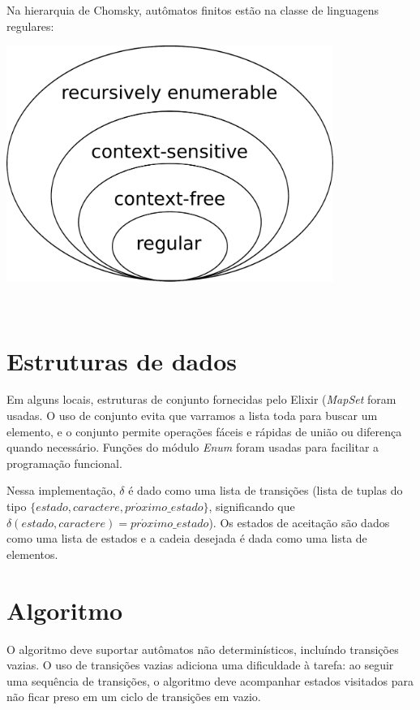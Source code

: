 \documentclass[conference]{IEEEtran}
\begin{document}
Na hierarquia de Chomsky, autômatos finitos estão na classe de linguagens regulares:

\begin{minipage}{\linewidth}
    \centering
    \label{chomsky}
    \includegraphics[width=0.8\textwidth]{Chomsky-hierarchy.pdf}
\end{minipage}
\\

\section{Estruturas de dados}

Em alguns locais, estruturas de conjunto fornecidas pelo Elixir (\emph{MapSet} foram usadas. O uso de conjunto evita que varramos a lista toda para buscar um elemento, e o conjunto permite operações fáceis e rápidas de união ou diferença quando necessário. Funções do módulo \emph{Enum} foram usadas para facilitar a programação funcional.

Nessa implementação, $\delta$ é dado como uma lista de transições (lista de tuplas do tipo $\{estado, caractere, pr\acute{o}ximo\_estado\}$, significando que $\delta(estado, caractere) = pr\acute{o}ximo\_estado$). Os estados de aceitação são dados como uma lista de estados e a cadeia desejada é dada como uma lista de elementos.

\section{Algoritmo}

O algoritmo deve suportar autômatos não determinísticos, incluíndo transições vazias. O uso de transições vazias adiciona uma dificuldade à tarefa: ao seguir uma sequência de transições, o algoritmo deve acompanhar estados visitados para não ficar preso em um ciclo de transições em vazio.
\end{document}
